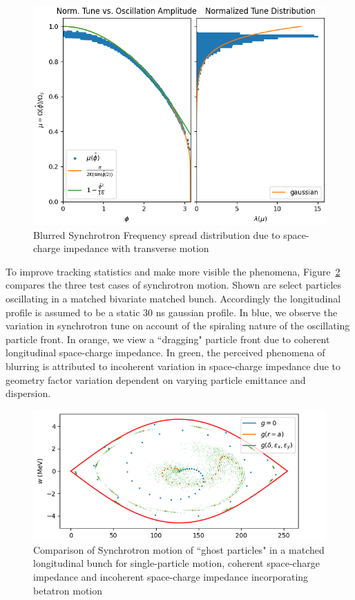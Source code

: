 \begin{figure}
    \centering
    \includegraphics{figs/tune_blurr/blurred_tune.png}
    \caption{Blurred Synchrotron Frequency spread distribution due to space-charge impedance with transverse motion}
    \label{fig:tune_blurr}
\end{figure}

To improve tracking statistics and make more visible the phenomena, Figure~\ref{fig:full_comparison} compares the three test cases of synchrotron motion. Shown are select particles oscillating in a matched bivariate matched bunch. Accordingly the longitudinal profile is assumed to be a static 30 ns gaussian profile. In blue, we observe the variation in synchrotron tune on account of the spiraling nature of the oscillating particle front. In orange, we view a ``dragging" particle front due to coherent longitudinal space-charge impedance. In green, the perceived phenomena of blurring is attributed to incoherent variation in space-charge impedance due to geometry factor variation dependent on varying particle emittance and dispersion.

\begin{figure}
    \centering
    \includegraphics[width=\linewidth]{figs/tune_blurr/trajectories.png}
    \caption{Comparison of Synchrotron motion of ``ghost particles" in a matched longitudinal bunch for single-particle motion, coherent space-charge impedance and incoherent space-charge impedance incorporating betatron motion}
    \label{fig:full_comparison}
\end{figure}

